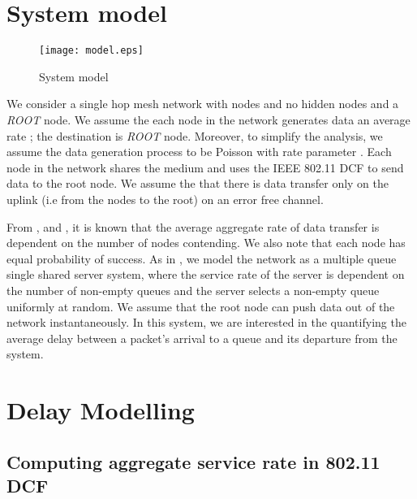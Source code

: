 \documentclass[10pt, conference, compsocconf]{IEEEtran}
\begin{document}
\section{\large{System model}}
\label{model}
\begin{figure}[h]
\centering
\texttt{[image: model.eps]}
\caption {System model}
\label{fig:model}
\end{figure}

We consider a single hop mesh network with  nodes and no hidden nodes and a \textit{ROOT} node. We assume the each node in the network generates data an average rate ; the destination is \textit{ROOT} node. Moreover, to simplify the analysis, we assume the data generation process to be Poisson with rate parameter . Each node in the network shares the medium and uses the IEEE 802.11 DCF to send data to the root node. We assume the that there is data transfer only on the uplink (i.e from the nodes to the root) on an error free channel. 

From \cite{bianchi}, \cite{tay} and \cite{akumar}, it is known that the average aggregate rate of data transfer is dependent on the number of nodes contending. We also note that each node has equal probability of success. As in \cite{tobagi}, we model the network as a multiple queue single shared server system, where the service rate of the server is dependent on the number of non-empty queues and the server selects a non-empty queue uniformly at random. We assume that the root node can push data out of the network instantaneously. In this system, we are interested in the quantifying the average delay between a packet's arrival to a queue and its departure from the system. 

\section{\large{Delay Modelling}}
\label{analysis}

\subsection{Computing aggregate service rate in 802.11 DCF}
\end{document}
